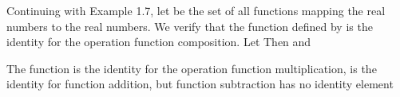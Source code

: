 \documentclass[11pt,oneside]{article}
\begin{document}
\begin{BookBody}
 Continuing with Example 1.7, let  be the set of all functions mapping the real numbers to the real numbers. We verify that the function defined by  is the identity for the operation function composition. Let  Then  and  

The function  is the identity for the operation function multiplication,  is the identity for function addition, but function subtraction has no identity element\BookEnd{\blacktriangle}

\end{BookBody}

\BookNarrativetrue
\end{document}
